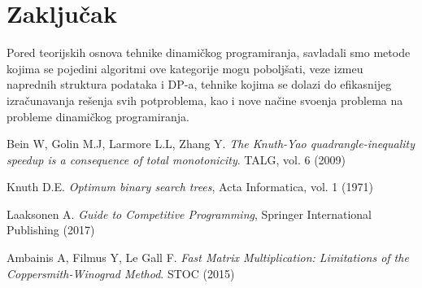 \documentclass[a4paper,12pt]{article}
\numberwithin{equation}{subsection}
\begin{document}
\section{Zaklju\v cak}

Pored teorijskih osnova tehnike dinami\v ckog programiranja, savladali smo metode kojima se pojedini algoritmi ove kategorije mogu pobolj\v sati, veze izme\dj u naprednih struktura podataka i DP-a, tehnike kojima se dolazi do efikasnijeg izra\v cunavanja re\v senja svih potproblema, kao i nove na\v cine svo\dj enja problema na probleme dinami\v ckog programiranja.


\begin{thebibliography}{10}

 Bein W, Golin M.J, Larmore L.L, Zhang Y. \textit{The Knuth-Yao quadrangle-inequality speedup is a consequence of total monotonicity}. TALG, vol. 6 (2009)

 Knuth D.E. \textit{Optimum binary search trees}, Acta Informatica, vol. 1 (1971)

 Laaksonen A. \textit{Guide to Competitive Programming}, Springer International Publishing (2017)

 Ambainis A, Filmus Y, Le Gall F. \textit{Fast Matrix Multiplication: Limitations of the Coppersmith-Winograd Method}. STOC (2015)

\end{thebibliography}
\end{document}
